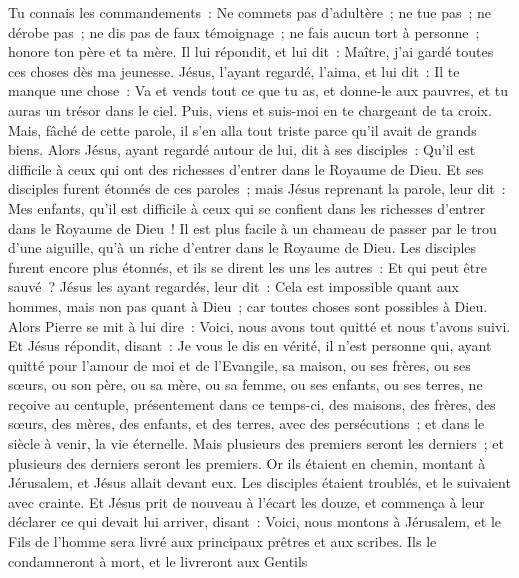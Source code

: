 \begin{multicols}{2}
Tu connais les commandements~: Ne commets pas d'adultère~; ne tue pas~; ne dérobe pas~; ne dis pas de faux témoignage~; ne fais aucun tort à personne~; honore ton père et ta mère.
Il lui répondit, et lui dit~: Maître, j'ai gardé toutes ces choses dès ma jeunesse.
Jésus, l'ayant regardé, l'aima, et lui dit~: Il te manque une chose~: Va et vends tout ce que tu as, et donne-le aux pauvres, et tu auras un trésor dans le ciel. Puis, viens et suis-moi en te chargeant de ta croix.
Mais, fâché de cette parole, il s'en alla tout triste parce qu'il avait de grands biens.
Alors Jésus, ayant regardé autour de lui, dit à ses disciples~: Qu'il est difficile à ceux qui ont des richesses d'entrer dans le Royaume de Dieu.
Et ses disciples furent étonnés de ces paroles~; mais Jésus reprenant la parole, leur dit~: Mes enfants, qu'il est difficile à ceux qui se confient dans les richesses d'entrer dans le Royaume de Dieu~!
Il est plus facile à un chameau de passer par le trou d'une aiguille, qu'à un riche d'entrer dans le Royaume de Dieu.
Les disciples furent encore plus étonnés, et ils se dirent les uns les autres~: Et qui peut être sauvé~?
Jésus les ayant regardés, leur dit~: Cela est impossible quant aux hommes, mais non pas quant à Dieu~; car toutes choses sont possibles à Dieu.
Alors Pierre se mit à lui dire~: Voici, nous avons tout quitté et nous t'avons suivi.
Et Jésus répondit, disant~: Je vous le dis en vérité, il n'est personne qui, ayant quitté pour l'amour de moi et de l'Evangile, sa maison, ou ses frères, ou ses sœurs, ou son père, ou sa mère, ou sa femme, ou ses enfants, ou ses terres,
ne reçoive au centuple, présentement dans ce temps-ci, des maisons, des frères, des sœurs, des mères, des enfants, et des terres, avec des persécutions~; et dans le siècle à venir, la vie éternelle.
Mais plusieurs des premiers seront les derniers~; et plusieurs des derniers seront les premiers.
Or ils étaient en chemin, montant à Jérusalem, et Jésus allait devant eux. Les disciples étaient troublés, et le suivaient avec crainte. Et Jésus prit de nouveau à l'écart les douze, et commença à leur déclarer ce qui devait lui arriver,
disant~: Voici, nous montons à Jérusalem, et le Fils de l'homme sera livré aux principaux prêtres et aux scribes. Ils le condamneront à mort, et le livreront aux Gentils

\end{multicols}
